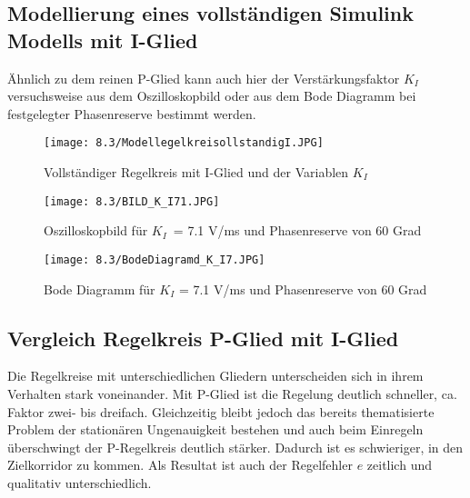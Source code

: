 \documentclass[12pt,a4paper]{scrartcl}	%
\begin{document}
\subsection{Modellierung eines vollständigen Simulink Modells mit I-Glied}
Ähnlich zu dem reinen P-Glied kann auch hier der Verstärkungsfaktor $K_I$ versuchsweise aus dem Oszilloskopbild oder aus dem Bode Diagramm bei festgelegter Phasenreserve bestimmt werden.
\begin{figure}[tbh]
	\centering
	\texttt{[image: 8.3/ModellegelkreisollstandigI.JPG]}
	\caption{Vollständiger Regelkreis mit I-Glied und der Variablen $K_I$}
\end{figure}
\begin{figure}[tbh]
	\centering
	\texttt{[image: 8.3/BILD\_K\_I71.JPG]}
	\caption{Oszilloskopbild für $K_I$~= 7.1 V/ms und Phasenreserve von 60 Grad}
\end{figure}
\begin{figure}[tbh]
	\centering
	\texttt{[image: 8.3/BodeDiagramd\_K\_I7.JPG]}
	\caption{Bode Diagramm für $K_I$ = 7.1 V/ms und Phasenreserve von 60 Grad}
\end{figure}
\subsection{Vergleich Regelkreis P-Glied mit I-Glied}
Die Regelkreise mit unterschiedlichen Gliedern unterscheiden sich in ihrem Verhalten stark voneinander.
Mit P-Glied ist die Regelung deutlich schneller, ca. Faktor zwei- bis dreifach. Gleichzeitig bleibt jedoch das bereits thematisierte Problem der stationären Ungenauigkeit bestehen und auch beim Einregeln überschwingt der P-Regelkreis deutlich stärker. Dadurch ist es schwieriger, in den Zielkorridor zu kommen. Als Resultat ist auch der Regelfehler $e$ zeitlich und qualitativ unterschiedlich.
\end{document}
